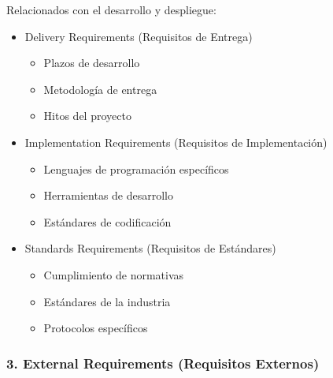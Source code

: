     Relacionados con el desarrollo y despliegue:


    \begin{itemize}

        \item Delivery Requirements (Requisitos de Entrega)
        \begin{itemize}

            \item Plazos de desarrollo

            \item Metodología de entrega

            \item Hitos del proyecto

        \end{itemize}



        \item Implementation Requirements (Requisitos de Implementación)
        \begin{itemize}

            \item Lenguajes de programación específicos

            \item Herramientas de desarrollo

            \item Estándares de codificación

        \end{itemize}



        \item Standards Requirements (Requisitos de Estándares)
        \begin{itemize}

            \item Cumplimiento de normativas

            \item Estándares de la industria

            \item Protocolos específicos

        \end{itemize}


    \end{itemize}

    \subsubsection{3. External Requirements (Requisitos Externos)}

